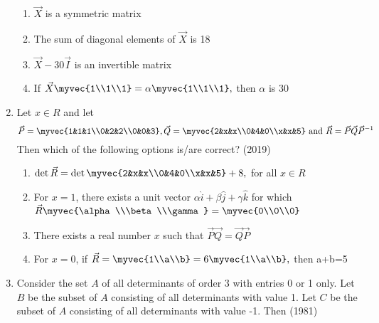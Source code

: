\begin{enumerate}[label=\thesubsection.\arabic*.,ref=\thesubsection.\theenumi]
\begin{enumerate}
	\item $\vec{X}$ is a symmetric matrix
	\item The sum of diagonal elements of $\vec{X}$ is 18
	\item $\vec{X}-30\vec{I}$ is an invertible matrix
	\item If $\vec{X}\myvec{1\\1\\1}=\alpha\myvec{1\\1\\1},$ then $\alpha$ is 30
\end{enumerate}
%
\item Let $x\in R$ and let
$$\vec{P} = \myvec{1&1&1\\0&2&2\\0&0&3},\vec{Q} = \myvec{2&x&x\\0&4&0\\x&x&5} \text{ and }\vec{R}=\vec{P}\vec{Q}\vec{P}^{-1}$$
Then which of the following options is/are correct? \hfill (2019)
%
\begin{enumerate}
\item $\det \vec{R} = \det\myvec{2&x&x\\0&4&0\\x&x&5}+8,$ for all $x\in R$
\item For $x=1$, there exists a unit vector $\alpha\hat{i}+\beta\hat{j}+\gamma\hat{k}$ for which $\vec{R}\myvec{\alpha\\\beta\\\gamma}=\myvec{0\\0\\0}$
		\item There exists a real number $x$ such that $\vec{P}\vec{Q} = \vec{Q}\vec{P}$
		\item For $x=0$, if $\vec{R}=\myvec{1\\a\\b}=6\myvec{1\\a\\b},$ then a+b=5\\[2pt]
\end{enumerate}
	\item Consider the set ${A}$ of all determinants of order 3 with entries
		0 or 1 only. Let ${B}$ be the subset of ${A}$ consisting of all
		determinants with value 1. Let $C$ be the subset of ${A}$ consisting
		of all determinants with value -1. Then
		\hfill (1981)
		\begin{multicols}{2}
			\begin{enumerate}

\end{enumerate}
\end{multicols}
\end{enumerate}
